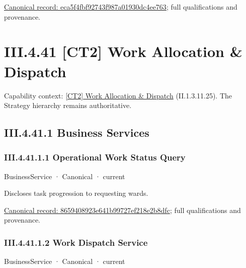 {\footnotesize \href{../../../../continuum/business/business-function/eca5f4fbf92743f987a01930dc4ee763.md}{Canonical record: eca5f4fbf92743f987a01930dc4ee763}; full qualifications and provenance.}\par
\section*{III.4.41 [CT2] Work Allocation \& Dispatch}
\label{navigation:III.4.41}

{\small Capability context: \hyperref[element:152a5252952c405994e9b171234efcb0]{[CT2] Work Allocation \& Dispatch} (II.1.3.11.25). The Strategy hierarchy remains authoritative.}\par
\subsection*{III.4.41.1 Business Services}
\label{navigation:III.4.41.1}

\subsubsection*{III.4.41.1.1 Operational Work Status Query}
\label{navigation:III.4.41.1.1}

\label{element:8659408923e641b99727ef218e2b8dfc}
{\small BusinessService · Canonical · current}\par

Discloses task progression to requesting wards.


{\footnotesize \href{../../../../continuum/business/business-service/8659408923e641b99727ef218e2b8dfc.md}{Canonical record: 8659408923e641b99727ef218e2b8dfc}; full qualifications and provenance.}\par
\subsubsection*{III.4.41.1.2 Work Dispatch Service}
\label{navigation:III.4.41.1.2}

\label{element:7410926f15d3480eaa856d998d67d83f}
{\small BusinessService · Canonical · current}\par

